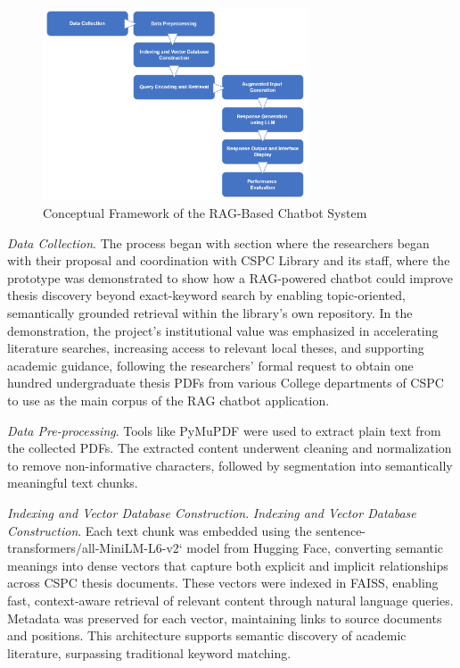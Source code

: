 \begin{refsection}
\begin{figure}[H]
    \centering
    \includegraphics[width=0.7\textwidth]{figures/framework.png}
    \caption{Conceptual Framework of the RAG-Based Chatbot System}
    \label{fig:conceptual_framework}
\end{figure}

\textit{Data Collection}. The process began with section where the researchers began with their proposal and coordination with CSPC Library and its staff, where the prototype was demonstrated to show how a RAG-powered chatbot could improve thesis discovery beyond exact-keyword search by enabling topic-oriented, semantically grounded retrieval within the library’s own repository. In the demonstration, the project’s institutional value was emphasized in accelerating literature searches, increasing access to relevant local theses, and supporting academic guidance, following the researchers' formal request to obtain one hundred undergraduate thesis PDFs from various College departments of CSPC to use as the main corpus of the RAG chatbot application.

\textit{Data Pre-processing}. Tools like PyMuPDF were used to extract plain text from the collected PDFs. The extracted content underwent cleaning and normalization to remove non-informative characters, followed by segmentation into semantically meaningful text chunks.

\textit{Indexing and Vector Database Construction}. \textit{Indexing and Vector Database Construction}. Each text chunk was embedded using the sentence-transformers/all-MiniLM-L6-v2` model from Hugging Face, converting semantic meanings into dense vectors that capture both explicit and implicit relationships across CSPC thesis documents. These vectors were indexed in FAISS, enabling fast, context-aware retrieval of relevant content through natural language queries. Metadata was preserved for each vector, maintaining links to source documents and positions. This architecture supports semantic discovery of academic literature, surpassing traditional keyword matching.


\end{refsection}
